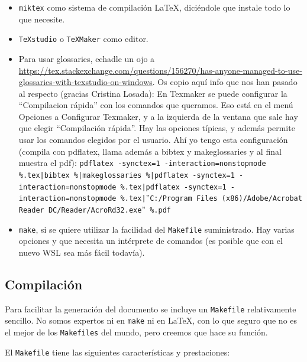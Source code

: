 \documentclass[spanish,openright]{book}
\begin{document}
\begin{itemize}
  \begin{itemize}
  \item \texttt{miktex} como sistema de compilación \LaTeX{}, diciéndole
    que instale todo lo que necesite.
  \item \texttt{TeXstudio} o \texttt{TeXMaker} como editor.
  \item Para usar glossaries, echadle un ojo a
    \url{https://tex.stackexchange.com/questions/156270/has-anyone-managed-to-use-glossaries-with-texstudio-on-windows}. Os
    copio aquí info que nos han pasado al respecto (gracias Cristina
    Losada): En Texmaker se puede configurar la “Compilacion rápida”
    con los comandos que queramos. Eso está en el menú Opciones a
    Configurar Texmaker, y a la izquierda de la ventana que sale hay
    que elegir “Compilación rápida”. Hay las opciones típicas, y
    además permite usar los comandos elegidos por el usuario. Ahí yo
    tengo esta configuración (compila con pdflatex, llama además a
    bibtex y makeglossaries y al final muestra el pdf):
    \texttt{pdflatex -synctex=1 -interaction=nonstopmode \%.tex|bibtex \%|makeglossaries \%|pdflatex -synctex=1 -interaction=nonstopmode \%.tex|pdflatex -synctex=1 -interaction=nonstopmode \%.tex|}''\texttt{C:/Program Files (x86)/Adobe/Acrobat Reader DC/Reader/AcroRd32.exe}''\texttt{ \%.pdf}
  \item \texttt{make}, si se quiere utilizar la facilidad del
    \texttt{Makefile} suministrado. Hay varias opciones y que necesita
    un intérprete de comandos (es posible que con el nuevo WSL sea más
    fácil todavía).
  \end{itemize}
\end{itemize}

\subsection{Compilación}
\label{sec:compilacion}

Para facilitar la generación del documento se incluye un
\texttt{Makefile} relativamente sencillo. No somos expertos ni en
\texttt{make} ni en \LaTeX, con lo que seguro que no es el mejor de los
\texttt{Makefiles} del mundo, pero creemos que hace su función.

El \texttt{Makefile} tiene las siguientes características y
prestaciones:
\end{document}
